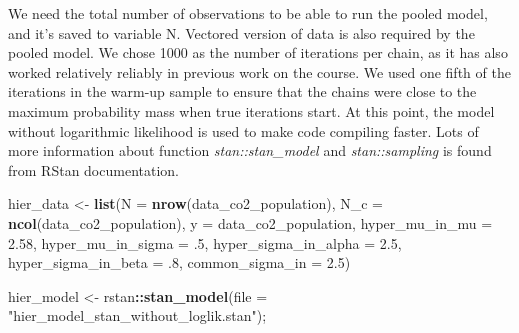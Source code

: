 \documentclass[
]{article}
\newenvironment{Shaded}{\begin{snugshade}}{\end{snugshade}}
\newcommand{\DataTypeTok}[1]{\textcolor[rgb]{0.13,0.29,0.53}{#1}}
\newcommand{\FloatTok}[1]{\textcolor[rgb]{0.00,0.00,0.81}{#1}}
\newcommand{\KeywordTok}[1]{\textcolor[rgb]{0.13,0.29,0.53}{\textbf{#1}}}
\newcommand{\NormalTok}[1]{#1}
\newcommand{\OperatorTok}[1]{\textcolor[rgb]{0.81,0.36,0.00}{\textbf{#1}}}
\newcommand{\StringTok}[1]{\textcolor[rgb]{0.31,0.60,0.02}{#1}}
\begin{document}
We need the total number of observations to be able to run the pooled
model, and it's saved to variable N. Vectored version of data is also
required by the pooled model. We chose 1000 as the number of iterations
per chain, as it has also worked relatively reliably in previous work on
the course. We used one fifth of the iterations in the warm-up sample to
ensure that the chains were close to the maximum probability mass when
true iterations start. At this point, the model without logarithmic
likelihood is used to make code compiling faster. Lots of more
information about function \emph{stan::stan\_model} and
\emph{stan::sampling} is found from RStan documentation.

\begin{Shaded}
\begin{Highlighting}[]
\NormalTok{hier\_data \textless{}{-}}\StringTok{ }\KeywordTok{list}\NormalTok{(}\DataTypeTok{N =} \KeywordTok{nrow}\NormalTok{(data\_co2\_population),}
                  \DataTypeTok{N\_c =} \KeywordTok{ncol}\NormalTok{(data\_co2\_population),}
                  \DataTypeTok{y =}\NormalTok{ data\_co2\_population,}
                  \DataTypeTok{hyper\_mu\_in\_mu =} \FloatTok{2.58}\NormalTok{,}
                  \DataTypeTok{hyper\_mu\_in\_sigma =} \FloatTok{.5}\NormalTok{,}
                  \DataTypeTok{hyper\_sigma\_in\_alpha =} \FloatTok{2.5}\NormalTok{,}
                  \DataTypeTok{hyper\_sigma\_in\_beta =} \FloatTok{.8}\NormalTok{,}
                  \DataTypeTok{common\_sigma\_in =} \FloatTok{2.5}\NormalTok{)}


\NormalTok{hier\_model \textless{}{-}}\StringTok{ }\NormalTok{rstan}\OperatorTok{::}\KeywordTok{stan\_model}\NormalTok{(}\DataTypeTok{file =} \StringTok{"hier\_model\_stan\_without\_loglik.stan"}\NormalTok{);}
\end{Highlighting}
\end{Shaded}
\end{document}
